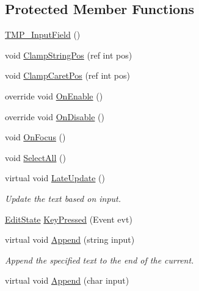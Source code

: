 \subsection*{Protected Member Functions}
\begin{DoxyCompactItemize}
\item 
\mbox{\hyperlink{class_t_m_pro_1_1_t_m_p___input_field_a39810a33ebf30c8d6988cbecc4039c66}{T\+M\+P\+\_\+\+Input\+Field}} ()
\item 
void \mbox{\hyperlink{class_t_m_pro_1_1_t_m_p___input_field_a732fc6d9f7104a4ce580164aa86e14d2}{Clamp\+String\+Pos}} (ref int pos)
\item 
void \mbox{\hyperlink{class_t_m_pro_1_1_t_m_p___input_field_a80e2f1a3a3ab3fd938e07396f6cc7647}{Clamp\+Caret\+Pos}} (ref int pos)
\item 
override void \mbox{\hyperlink{class_t_m_pro_1_1_t_m_p___input_field_ad2ff861cc6eb60e636a7dc4cb8280437}{On\+Enable}} ()
\item 
override void \mbox{\hyperlink{class_t_m_pro_1_1_t_m_p___input_field_ae84831aa9c5d44a1ca91685d772b44d4}{On\+Disable}} ()
\item 
void \mbox{\hyperlink{class_t_m_pro_1_1_t_m_p___input_field_ab9ec006dcffd4f1aceb65e632e224c49}{On\+Focus}} ()
\item 
void \mbox{\hyperlink{class_t_m_pro_1_1_t_m_p___input_field_ae7246b94a4be46fb34a132db2cbcbf98}{Select\+All}} ()
\item 
virtual void \mbox{\hyperlink{class_t_m_pro_1_1_t_m_p___input_field_a4b7cccc36ecd8672c02a29ef7ebc2dd3}{Late\+Update}} ()
\begin{DoxyCompactList}\small\item\em Update the text based on input. \end{DoxyCompactList}\item 
\mbox{\hyperlink{class_t_m_pro_1_1_t_m_p___input_field_a12fc070748fd5c39cbb8c907aa3145ee}{Edit\+State}} \mbox{\hyperlink{class_t_m_pro_1_1_t_m_p___input_field_a9ef972ef2261f10383fd4a900a9c3449}{Key\+Pressed}} (Event evt)
\item 
virtual void \mbox{\hyperlink{class_t_m_pro_1_1_t_m_p___input_field_a3d675445c819058d84bfa8b8889fb119}{Append}} (string input)
\begin{DoxyCompactList}\small\item\em Append the specified text to the end of the current. \end{DoxyCompactList}\item 
virtual void \mbox{\hyperlink{class_t_m_pro_1_1_t_m_p___input_field_a3d0b5e6b105dd61c4cfb9cfeb7956133}{Append}} (char input)

\end{DoxyCompactItemize}
